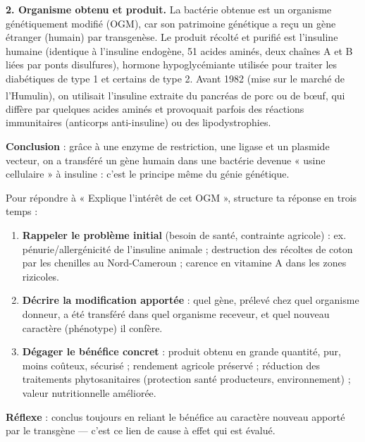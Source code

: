\documentclass[11pt]{article}
\newcommand{\cle}[1]{{\popxbold\color{popdark}#1}}
\newcounter{popsec}
\newcounter{popsub}
\newcommand{\courssub}[1]{%
  \stepcounter{popsub}%
  \par\vspace{9pt}\noindent{\popxbold\fontsize{11.5}{13}\selectfont\color{popink}{\color{poporange}\thepopsec.\thepopsub}\hspace{6pt}#1}\par\nopagebreak\vspace{4pt}
}
\begin{document}
\begin{exoresolu}
\begin{itemize}
\end{itemize}
\textbf{2. Organisme obtenu et produit.} La bactérie obtenue est un \cle{organisme génétiquement modifié} (OGM), car son patrimoine génétique a reçu un gène étranger (humain) par transgenèse. Le produit récolté et purifié est l'\cle{insuline humaine} (identique à l'insuline endogène, 51 acides aminés, deux chaînes A et B liées par ponts disulfures), hormone hypoglycémiante utilisée pour traiter les diabétiques de type 1 et certains de type 2. Avant 1982 (mise sur le marché de l'Humulin\textsuperscript{\textregistered}), on utilisait l'insuline extraite du pancréas de porc ou de bœuf, qui diffère par quelques acides aminés et provoquait parfois des réactions immunitaires (anticorps anti-insuline) ou des lipodystrophies.

\textbf{Conclusion} : grâce à une enzyme de restriction, une ligase et un plasmide vecteur, on a transféré un gène humain dans une bactérie devenue « usine cellulaire » à insuline : c'est le principe même du génie génétique.
\end{exoresolu}

\courssub{Applications du génie génétique}

\begin{methode}
Pour répondre à « Explique l'intérêt de cet OGM », structure ta réponse en trois temps :
\begin{enumerate}
\item \textbf{Rappeler le problème initial} (besoin de santé, contrainte agricole) : ex. pénurie/allergénicité de l'insuline animale ; destruction des récoltes de coton par les chenilles au Nord-Cameroun ; carence en vitamine A dans les zones rizicoles.
\item \textbf{Décrire la modification apportée} : quel gène, prélevé chez quel organisme donneur, a été transféré dans quel organisme receveur, et quel nouveau caractère (phénotype) il confère.
\item \textbf{Dégager le bénéfice concret} : produit obtenu en grande quantité, pur, moins coûteux, sécurisé ; rendement agricole préservé ; réduction des traitements phytosanitaires (protection santé producteurs, environnement) ; valeur nutritionnelle améliorée.
\end{enumerate}
\textbf{Réflexe} : conclus toujours en reliant le bénéfice au caractère nouveau apporté par le transgène — c'est ce lien de cause à effet qui est évalué.
\end{methode}
\end{document}
